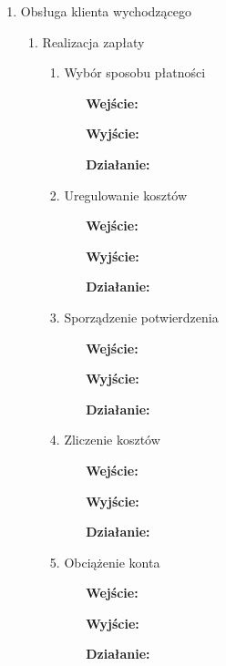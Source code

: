\documentclass[a4paper, 11pt]{article}
\begin{document}
\begin{enumerate}[label*=\arabic*.]
\begin{enumerate}[label*=\arabic*.]
\begin{enumerate}[label*=\arabic*.]
\begin{itemize}
\begin{itemize}
					\end{itemize}														
				\end{itemize}	
			\end{enumerate}									
			\item Obsługa klienta wychodzącego
			\begin{enumerate}[label*=\arabic*.]
				\item Realizacja zapłaty
				\begin{enumerate}[label*=\arabic*.]
					\item Wybór sposobu płatności
					\begin{itemize}
						\item [\textbf{Wejście:}] 
						\item [\textbf{Wyjście:}]
						\item [\textbf{Działanie:}]
					\end{itemize}
					\item Uregulowanie kosztów
					\begin{itemize}
						\item [\textbf{Wejście:}] 
						\item [\textbf{Wyjście:}]
						\item [\textbf{Działanie:}] 
					\end{itemize}					
					\item Sporządzenie potwierdzenia
					\begin{itemize}
						\item [\textbf{Wejście:}] 
						\item [\textbf{Wyjście:}]
						\item [\textbf{Działanie:}] 
					\end{itemize}
					\item Zliczenie kosztów
					\begin{itemize}
						\item [\textbf{Wejście:}] 
						\item [\textbf{Wyjście:}]
						\item [\textbf{Działanie:}] 
					\end{itemize}
					\item Obciążenie konta
					\begin{itemize}
						\item [\textbf{Wejście:}] 
						\item [\textbf{Wyjście:}]
						\item [\textbf{Działanie:}] 
					\end{itemize}
				\end{enumerate}													

\end{enumerate}
\end{enumerate}
\end{enumerate}
\end{document}
